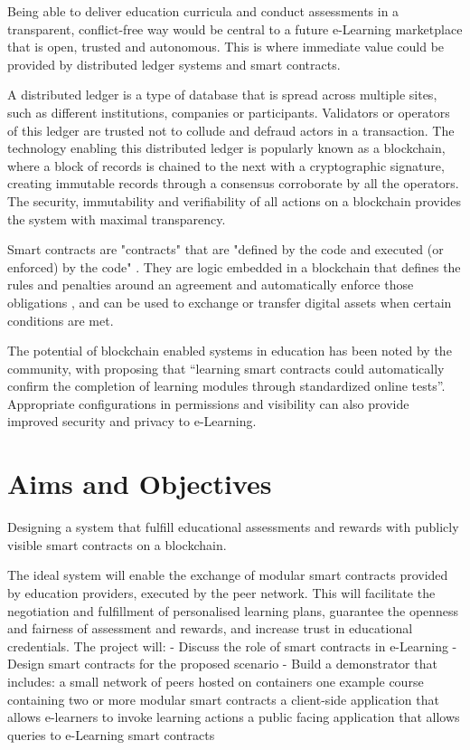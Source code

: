 Being able to deliver education curricula and conduct assessments in a transparent, conflict-free way would be central to 
a future e-Learning marketplace that is open, trusted and autonomous.
This is where immediate value could be provided by distributed ledger systems and smart contracts.

A distributed ledger is a type of database that is spread across multiple sites, such as different institutions, companies 
or participants. Validators or operators of this ledger are trusted not to collude and defraud actors in a transaction. 
The technology enabling this distributed ledger is popularly known as a blockchain, 
where a block of records is chained to the next with a cryptographic signature, creating immutable records through a consensus
corroborate by all the operators. \citep[p.17]{walport2016distributed}
The security, immutability and verifiability of all actions on a blockchain provides the system with maximal transparency.

Smart contracts are "contracts" that are "defined by the code and executed (or enforced) by the code" \citep[p.16]{swan2015blockchain}.
They are logic embedded in a blockchain that defines the rules and penalties around an agreement and automatically enforce 
those obligations \citep{gulhane2017ibm}, and can be used to exchange or transfer digital assets when certain conditions are met. 

The potential of blockchain enabled systems in education has been noted by the community, with \citet[p.62]{swan2015blockchain} 
proposing that “learning smart contracts could automatically confirm the completion of learning modules through standardized 
online tests”. Appropriate configurations in permissions and visibility can also provide improved security and privacy to e-Learning.

\section{Aims and Objectives} %

Designing a system that fulfill educational assessments and rewards with publicly visible smart contracts on a blockchain.

The ideal system will enable the exchange of modular smart contracts provided by education providers, executed by the peer network. This will facilitate the negotiation and fulfillment of personalised learning plans, guarantee the openness and fairness of assessment and rewards, and increase trust in educational credentials.
The project will:
-	Discuss the role of smart contracts in e-Learning
-	Design smart contracts for the proposed scenario
-	Build a demonstrator that includes:
a small network of peers hosted on containers
one example course containing two or more modular smart contracts
a client-side application that allows e-learners to invoke learning actions
a public facing application that allows queries to e-Learning smart contracts

